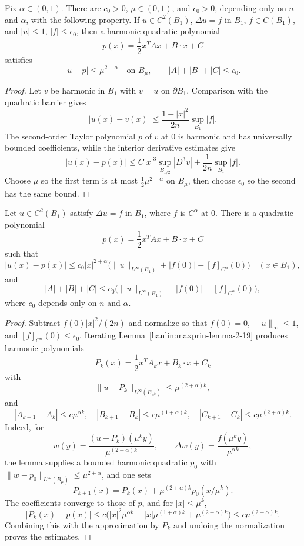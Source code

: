 \begin{lemma}\label{hanlin:maxprin-lemma-2-19}
Fix $\alpha\in(0,1)$. There are $c_0>0$, $\mu\in(0,1)$, and $\epsilon_0>0$,
depending only on $n$ and $\alpha$, with the following property. If
$u\in C^2(B_1)$, $\Delta u=f$ in $B_1$, $f\in C(B_1)$, and
$|u|\le1$, $|f|\le\epsilon_0$, then a harmonic quadratic polynomial
\[
p(x)=\frac12x^TAx+B\cdot x+C
\]
satisfies
\[
|u-p|\le\mu^{2+\alpha}\quad\text{on }B_\mu,
\qquad
|A|+|B|+|C|\le c_0.
\]
\end{lemma}
\begin{proof}
\sketch Let $v$ be harmonic in $B_1$ with $v=u$ on $\partial B_1$. Comparison
with the quadratic barrier gives
\[
|u(x)-v(x)|\le\frac{1-|x|^2}{2n}\sup_{B_1}|f|.
\]
The second-order Taylor polynomial $p$ of $v$ at $0$ is harmonic and has
universally bounded coefficients, while the interior derivative estimates give
\[
|u(x)-p(x)|
\le C|x|^3\sup_{B_{1/2}}|D^3v|+\frac1{2n}\sup_{B_1}|f|.
\]
Choose $\mu$ so the first term is at most $\frac12\mu^{2+\alpha}$ on $B_\mu$,
then choose $\epsilon_0$ so the second has the same bound.
\end{proof}

\begin{theorem}\label{hanlin:maxprin-theorem-2-20}
Let $u\in C^2(B_1)$ satisfy $\Delta u=f$ in $B_1$, where $f$ is
$C^\alpha$ at $0$. There is a quadratic polynomial
\[
p(x)=\frac12x^TAx+B\cdot x+C
\]
such that
\[
|u(x)-p(x)|\le c_0|x|^{2+\alpha}
\bigl(\|u\|_{L^\infty(B_1)}+|f(0)|+[f]_{C^\alpha}(0)\bigr)
\quad(x\in B_1),
\]
and
\[
|A|+|B|+|C|
\le c_0\bigl(\|u\|_{L^\infty(B_1)}+|f(0)|+[f]_{C^\alpha}(0)\bigr),
\]
where $c_0$ depends only on $n$ and $\alpha$.
\end{theorem}
\begin{proof}
\sketch Subtract $f(0)|x|^2/(2n)$ and normalize so that $f(0)=0$,
$\|u\|_\infty\le1$, and $[f]_{C^\alpha}(0)\le\epsilon_0$. Iterating
Lemma~\ref{hanlin:maxprin-lemma-2-19} produces harmonic polynomials
\[
P_k(x)=\frac12x^TA_kx+B_k\cdot x+C_k
\]
with
\[
\|u-P_k\|_{L^\infty(B_{\mu^k})}\le\mu^{(2+\alpha)k},
\]
and
\[
|A_{k+1}-A_k|\le c\mu^{\alpha k},\quad
|B_{k+1}-B_k|\le c\mu^{(1+\alpha)k},\quad
|C_{k+1}-C_k|\le c\mu^{(2+\alpha)k}.
\]
Indeed, for
\[
w(y)=\frac{(u-P_k)(\mu^ky)}{\mu^{(2+\alpha)k}},
\qquad
\Delta w(y)=\frac{f(\mu^ky)}{\mu^{\alpha k}},
\]
the lemma supplies a bounded harmonic quadratic $p_0$ with
$\|w-p_0\|_{L^\infty(B_\mu)}\le\mu^{2+\alpha}$, and one sets
\[
P_{k+1}(x)=P_k(x)+\mu^{(2+\alpha)k}p_0(x/\mu^k).
\]
The coefficients converge to those of $p$, and for $|x|\le\mu^k$,
\[
|P_k(x)-p(x)|
\le c\bigl(|x|^2\mu^{\alpha k}+|x|\mu^{(1+\alpha)k}
+\mu^{(2+\alpha)k}\bigr)
\le c\mu^{(2+\alpha)k}.
\]
Combining this with the approximation by $P_k$ and undoing the normalization
proves the estimates.
\end{proof}

